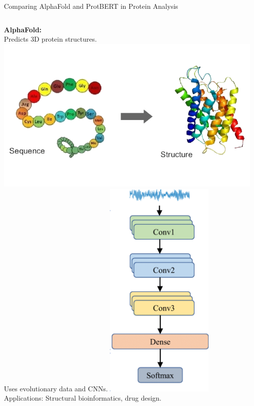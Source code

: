 \begin{frame}{Comparing AlphaFold and ProtBERT in Protein Analysis}
    \begin{columns}
        \begin{column}{0.5\textwidth}
            \textbf<1->{AlphaFold:}\\
                 {
                    Predicts 3D protein structures.
                    \vskip 1cm
                    \includegraphics[width = \textwidth]{images/alpha.PNG}
                    }
                 {
                    Uses evolutionary data and CNNs.
                    \vskip 1cm
                    \centering
                    \includegraphics[width = 0.4\textwidth]{images/cnn.PNG}
                    }
                 {
                    Applications: Structural bioinformatics, drug design.
}
\end{column}
\end{columns}
\end{frame}
